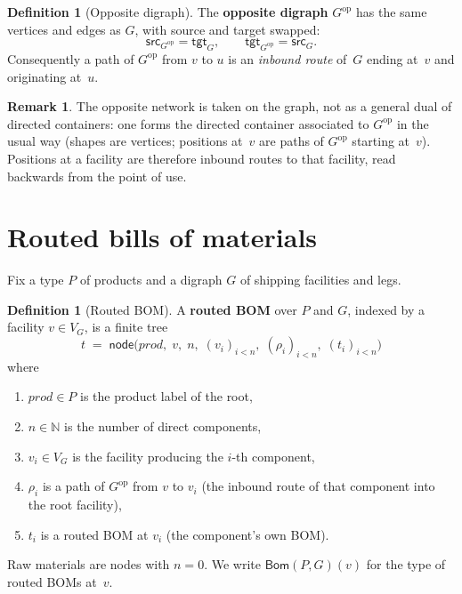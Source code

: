 \documentclass[11pt,a4paper]{article}
\theoremstyle{plain}
\theoremstyle{definition}
\newtheorem{definition}[theorem]{Definition}
\newtheorem{remark}[theorem]{Remark}
\newcommand{\Bom}{\mathsf{Bom}}
\newcommand{\op}{\mathrm{op}}
\begin{document}
\begin{definition}[Opposite digraph]\label{def:op}
The \textbf{opposite digraph} $G^\op$ has the same vertices and edges as
$G$, with source and target swapped:
\[
  \mathsf{src}_{G^\op} = \mathsf{tgt}_G,\qquad
  \mathsf{tgt}_{G^\op} = \mathsf{src}_G.
\]
Consequently a path of $G^\op$ from $v$ to $u$ is an \emph{inbound route}
of~$G$ ending at~$v$ and originating at~$u$.
\end{definition}

\begin{remark}
The opposite network is taken on the graph, not as a general dual of
directed containers: one forms the directed container associated to
$G^\op$ in the usual way (shapes are vertices; positions at~$v$ are paths
of $G^\op$ starting at~$v$). Positions at a facility are therefore inbound
routes to that facility, read backwards from the point of use.
\end{remark}

\section{Routed bills of materials}

Fix a type $P$ of products and a digraph $G$ of shipping facilities and
legs.

\begin{definition}[Routed BOM]\label{def:bom}
A \textbf{routed BOM} over $P$ and $G$, indexed by a facility
$v \in V_G$, is a finite tree
\[
  t \;=\; \mathsf{node}\bigl(
    \mathit{prod},\; v,\; n,\;
    (v_i)_{i < n},\;
    (\rho_i)_{i < n},\;
    (t_i)_{i < n}
  \bigr)
\]
where
\begin{enumerate}
  \item $\mathit{prod} \in P$ is the product label of the root,
  \item $n \in \mathbb{N}$ is the number of direct components,
  \item $v_i \in V_G$ is the facility producing the $i$-th component,
  \item $\rho_i$ is a path of $G^\op$ from $v$ to $v_i$ (the inbound route
        of that component into the root facility),
  \item $t_i$ is a routed BOM at $v_i$ (the component's own BOM).
\end{enumerate}
Raw materials are nodes with $n = 0$. We write $\Bom(P,G)(v)$ for the
type of routed BOMs at~$v$.
\end{definition}
\end{document}
